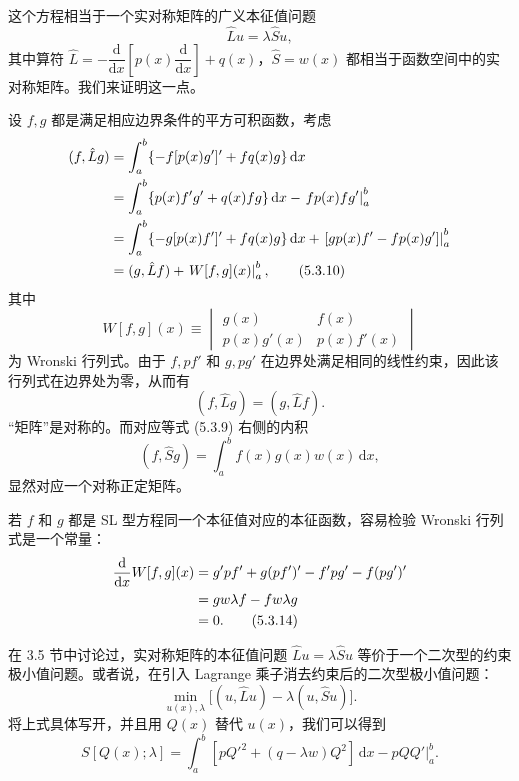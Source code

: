 这个方程相当于一个实对称矩阵的广义本征值问题
\begin{equation}
\hat L u=\lambda\hat S u,
\tag{5.3.9}
\end{equation}
其中算符 $\hat L=-\dfrac{\mathrm d}{\mathrm dx}\!\left[p(x)\dfrac{\mathrm d}{\mathrm dx}\right]+q(x)$，$\hat S=w(x)$ 都相当于函数空间中的实对称矩阵。我们来证明这一点。

设 $f,g$ 都是满足相应边界条件的平方可积函数，考虑
\begin{align}
(f,\hat Lg)
&=\int_a^b\{-f[p(x)g']'+fq(x)g\}\,\mathrm dx\notag\\
&=\int_a^b\{p(x)f'g'+q(x)fg\}\,\mathrm dx-\left.fp(x)fg'\right|_a^b\notag\\
&=\int_a^b\{-g[p(x)f']'+fq(x)g\}\,\mathrm dx
 +\left.[gp(x)f'-fp(x)g']\right|_a^b\notag\\
&=(g,\hat Lf)+\left.W[f,g](x)\right|_a^b,
\tag{5.3.10}
\end{align}
其中
\begin{equation}
W[f,g](x)\equiv
\begin{vmatrix}
g(x)&f(x)\\
p(x)g'(x)&p(x)f'(x)
\end{vmatrix}
\tag{5.3.11}
\end{equation}
为 Wronski 行列式。由于 $f,pf'$ 和 $g,pg'$ 在边界处满足相同的线性约束，因此该行列式在边界处为零，从而有
\begin{equation}
(f,\hat Lg)=(g,\hat Lf).
\tag{5.3.12}
\end{equation}
“矩阵”是对称的。而对应等式 (5.3.9) 右侧的内积
\begin{equation}
(f,\hat Sg)=\int_a^b f(x)g(x)w(x)\,\mathrm dx,
\tag{5.3.13}
\end{equation}
显然对应一个对称正定矩阵。

若 $f$ 和 $g$ 都是 SL 型方程同一个本征值对应的本征函数，容易检验 Wronski 行列式是一个常量：
\begin{align}
\frac{\mathrm d}{\mathrm dx}W[f,g](x)
&=g'pf'+g(pf')'-f'pg'-f(pg')'\notag\\
&=gw\lambda f-fw\lambda g\notag\\
&=0.
\tag{5.3.14}
\end{align}

在 3.5 节中讨论过，实对称矩阵的本征值问题 $\hat L u=\lambda\hat S u$ 等价于一个二次型的约束极小值问题。或者说，在引入 Lagrange 乘子消去约束后的二次型极小值问题：
\begin{equation}
\min_{u(x),\lambda}\big[(u,\hat L u)-\lambda(u,\hat S u)\big].
\tag{5.3.15}
\end{equation}
将上式具体写开，并且用 $Q(x)$ 替代 $u(x)$，我们可以得到
\begin{equation}
S[Q(x);\lambda]
=\int_a^b[pQ'^2+(q-\lambda w)Q^2] \,\mathrm dx
-\left.pQQ'\right|_a^b.
\tag{5.3.16}
\end{equation}

